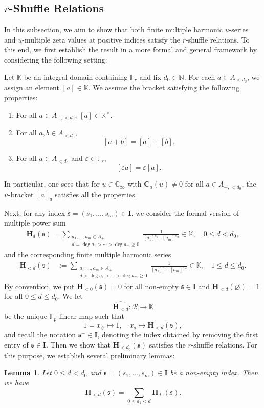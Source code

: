 \documentclass[12pt,reqno]{amsart}
\numberwithin{equation}{section}
\theoremstyle{plain}
\newtheorem{lem}[thm]{Lemma}
\theoremstyle{definition}
\theoremstyle{remark}
\newcommand{\NN}{\mathbb{N}}
\newcommand{\CC}{\mathbb{C}}
\newcommand{\FF}{\mathbb{F}}
\newcommand{\KK}{\mathbb{K}}
\newcommand{\Rcal}{\mathcal{R}}
\newcommand{\ww}[1]{\mathfrak{#1}}
\newcommand{\C}{\mathbf{C}}
\renewcommand{\H}{\mathbf{H}}
\newcommand{\Ical}{\mathbf{I}}
\begin{document}
\subsection{\texorpdfstring{$r$}{r}-Shuffle Relations}\label{section:3.2}

In this subsection, we aim to show that both finite multiple harmonic $u$-series and $u$-multiple zeta values at positive indices satisfy the $r$-shuffle relations. To this end, we first establish the result in a more formal and general framework by considering the following setting: 

Let $\mathbb{K}$ be an integral domain containing $\FF_r$ and fix $d_0\in\NN$. For each \(a\in A_{<d_0}\), we assign an element \([a]\in \mathbb{K}\).
We assume the bracket satisfying the following properties:
\begin{enumerate}
    \item For all $a\in A_{+,<d_0}$, $[a]\in\KK^\times$.
    \item For all \(a,b\in A_{<d_0}\),
    $$[a+b]=[a]+[b].$$
    \item For all $a\in A_{<d_0}$ and $\varepsilon\in\FF_r$,
    $$[\varepsilon a]=\varepsilon [a].$$
\end{enumerate}
In particular, one sees that for $u\in\CC_\infty$ with $\C_a(u)\neq 0$ for all $a\in A_{+,<d_0}$, the $u$-bracket $[a]_u$ satisfies all the properties.

Next, for any index $\ww{s}=(s_1,\ldots,s_m)\in\Ical$, we consider the formal version of multiple power sum
\begin{align}\label{eq:H_d def}
    \H_{d}(\ww{s}) = \sum_{\substack{a_1,\ldots,a_m\in A_+ \\ d=\deg a_1 > \cdots > \deg a_m \geq 0}} \frac{1}{[a_1]^{s_1}\cdots[a_m]^{s_m}} \in \KK,\quad 0\leq d<d_0,
\end{align}
and the corresponding finite multiple harmonic series
\begin{align}\label{eq:H_<d def}
        \H_{<d}(\ww{s})&:=\sum_{\substack{a_1,\ldots,a_m\in A_+\\d>\deg a_1>\cdots>\deg a_m\geq 0}}\frac{1}{[a_1]^{s_1}\cdots [a_m]^{s_m}}\in\KK,\quad 1\leq d\leq d_0.
    \end{align}
By convention, we put $\H_{<0}(\ww{s})=0$ for all non-empty $\ww{s}\in\Ical$ and $\H_{<d}(\varnothing)=1$ for all $0\leq d\leq d_0$.
We let
$$\widehat{\H_{<d}}:\Rcal\to\KK$$
be the unique $\FF_p$-linear map such that
$$1=x_{\varnothing}\mapsto 1,\quad x_{\ww{s}}\mapsto \H_{<d}(\ww{s}),$$
and recall the notation $\ww{s}^- \in \Ical$, denoting  the index obtained by removing the first entry of $\ww{s}\in\Ical$.
Then we show that $\H_{<d_0}(\ww{s})$ satisfies the $r$-shuffle relations.
For this purpose, we establish several preliminary lemmas:
\begin{lem}\label{lem:H<d=sumHd}
    Let $0\leq d<d_0$ and $\ww{s}=(s_1,\ldots,s_m)\in\Ical$ be a non-empty index. Then we have
    $$\H_{<d}(\ww{s})=\sum_{0\leq d_1<d}\H_{d_1}(\ww{s}).$$
\end{lem}
\end{document}
